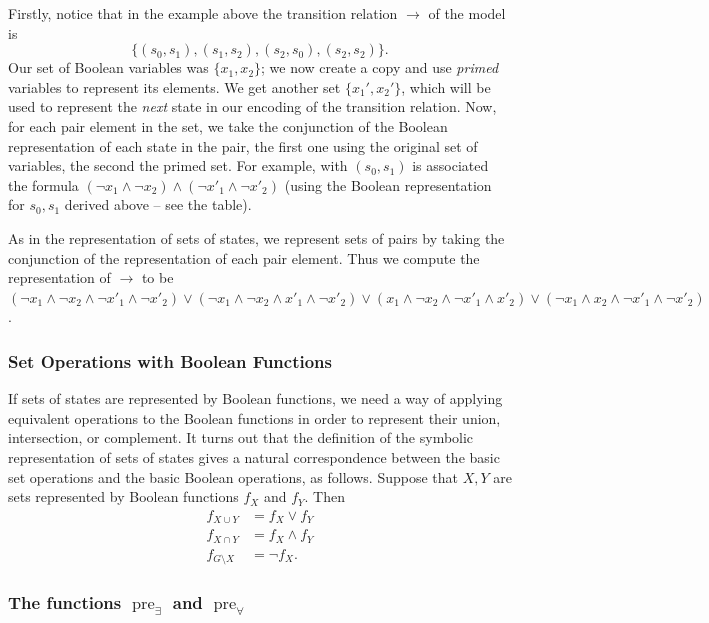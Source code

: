 \documentclass[11pt]{report}
\newcommand{\pre}{\mathop{\mathrm{pre}}}
\begin{document}
Firstly, notice that in the example above the transition relation $\rightarrow$ of the model is $$\{(s_0, s_1), (s_1, s_2), (s_2, s_0), (s_2, s_2)\}.$$
Our set of Boolean variables was $\{x_1, x_2\}$; we now create a copy and use \textit{primed} variables to represent its elements. We get another set $\{x_1', x_2'\}$, which will be used to represent the \textit{next} state in our encoding of the transition relation.
Now, for each pair element in the set, we take the conjunction of the Boolean representation of each state in the pair, the first one using the original set of variables, the second the primed set. For example, with $(s_0, s_1)$ is associated the formula $(\lnot x_1 \land \lnot x_2) \land (\lnot x'_1 \land \lnot x'_2)$ (using the Boolean representation for $s_0, s_1$ derived above -- see the table).

As in the representation of sets of states, we represent sets of pairs by taking the conjunction of the representation of each pair element. Thus we compute the representation of $\rightarrow$ to be $(\lnot x_1 \land \lnot x_2 \land \lnot x'_1 \land \lnot x'_2 ) \lor (\lnot x_1 \land \lnot x_2 \land x'_1 \land \lnot x'_2 ) \lor ( x_1 \land \lnot x_2 \land \lnot x'_1 \land  x'_2 ) \lor (\lnot x_1 \land x_2 \land \lnot x'_1 \land \lnot x'_2 )$.

\subsubsection{Set Operations with Boolean Functions}

If sets of states are represented by Boolean functions, we need a way of applying equivalent operations to the Boolean functions in order to represent their union, intersection, or complement. It turns out that the definition of the symbolic representation of sets of states gives a natural correspondence between the basic set operations and the basic Boolean operations, as follows. 
Suppose that $X, Y$ are sets represented by Boolean functions $f_X$ and $f_Y$. Then
\begin{align*}
f_{X \cup Y} &= f_X \lor f_Y\\
f_{X \cap Y} &= f_X \land f_Y \\
f_{G\setminus X} &= \lnot f_X.
\end{align*}

\subsubsection{The functions $\pre_\exists$ and $\pre_\forall$}
\end{document}
